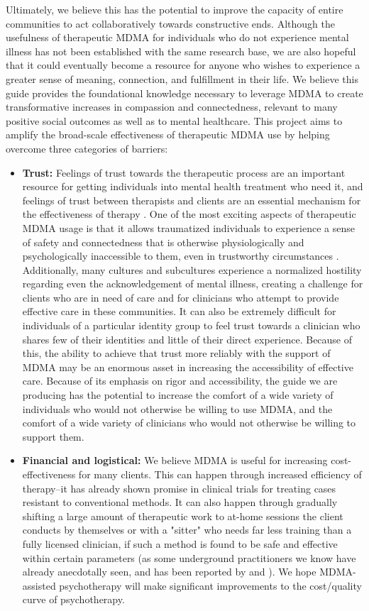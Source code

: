 \documentclass[12pt,letterpaper]{book}
\begin{document}
Ultimately, we believe this has the potential to improve the capacity of entire communities to act collaboratively towards constructive ends. Although the usefulness of therapeutic MDMA for individuals who do not experience mental illness has not been established with the same research base, we are also hopeful that it could eventually become a resource for anyone who wishes to experience a greater sense of meaning, connection, and fulfillment in their life. We believe this guide provides the foundational knowledge necessary to leverage MDMA to create transformative increases in compassion and connectedness, relevant to many positive social outcomes as well as to mental healthcare. This project aims to amplify the broad-scale effectiveness of therapeutic MDMA use by helping overcome three categories of barriers:
\begin{itemize}
    \item \textbf{Trust:} Feelings of trust towards the therapeutic process are an important resource for getting individuals into mental health treatment who need it, and feelings of trust between therapists and clients are an essential mechanism for the effectiveness of therapy \cite{wampoldCommonFactors}. One of the most exciting aspects of therapeutic MDMA usage is that it allows traumatized individuals to experience a sense of safety and connectedness that is otherwise physiologically and psychologically inaccessible to them, even in trustworthy circumstances \cite{fedduciaMDMAMemoryReconsolidation}. Additionally, many cultures and subcultures experience a normalized hostility regarding even the acknowledgement of mental illness, creating a challenge for clients who are in need of care and for clinicians who attempt to provide effective care in these communities. It can also be extremely difficult for individuals of a particular identity group to feel trust towards a clinician who shares few of their identities and little of their direct experience. Because of this, the ability to achieve that trust more reliably with the support of MDMA may be an enormous asset in increasing the accessibility of effective care. Because of its emphasis on rigor and accessibility, the guide we are producing has the potential to increase the comfort of a wide variety of individuals who would not otherwise be willing to use MDMA, and the comfort of a wide variety of clinicians who would not otherwise be willing to support them.
    \item \textbf{Financial and logistical:} We believe MDMA is useful for increasing cost-effectiveness for many clients. This can happen through increased efficiency of therapy–it has already shown promise in clinical trials for treating cases resistant to conventional methods. It can also happen through gradually shifting a large amount of therapeutic work to at-home sessions the client conducts by themselves or with a "sitter" who needs far less training than a fully licensed clinician, if such a method is found to be safe and effective within certain parameters (as some underground practitioners we know have already anecdotally seen, and has been reported by \textcite{colbertEvenings} and \textcite{hillsSolo}). We hope MDMA-assisted psychotherapy will make significant improvements to the cost/quality curve of psychotherapy.

\end{itemize}
\end{document}

